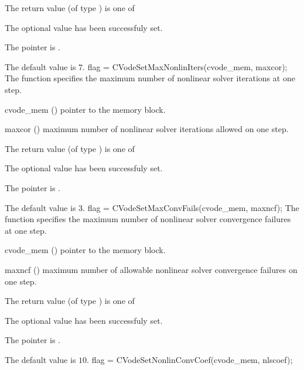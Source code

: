 {
  The return value  (of type ) is one of
  \begin{args}
  \item[\Id{SUCCESS}] 
    The optional value has been successfuly set.
  \item[\Id{CVS\_NO\_MEM}]
    The  pointer is .
  \end{args}
}
{
  The default value is $7$.
}
{
flag = CVodeSetMaxNonlinIters(cvode\_mem, maxcor);
}
{
  The function  specifies the maximum
  number of nonlinear solver iterations at one step.
}
{
  \begin{args}
  \item[cvode\_mem] ()
    pointer to the {\cvode} memory block.
  \item[maxcor] ()
    maximum number of nonlinear solver iterations allowed on one step.
  \end{args}
}
{
  The return value  (of type ) is one of
  \begin{args}
  \item[\Id{SUCCESS}] 
    The optional value has been successfuly set.
  \item[\Id{CVS\_NO\_MEM}]
    The  pointer is .
  \end{args}
}
{
  The default value is $3$.
}
{
flag = CVodeSetMaxConvFails(cvode\_mem, maxncf);
}
{
  The function  specifies the
  maximum number of nonlinear solver convergence failures at one step.
}
{
  \begin{args}
  \item[cvode\_mem] ()
    pointer to the {\cvode} memory block.
  \item[maxncf] ()
    maximum number of allowable nonlinear solver convergence failures
    on one step.
  \end{args}
}
{
  The return value  (of type ) is one of
  \begin{args}
  \item[\Id{SUCCESS}] 
    The optional value has been successfuly set.
  \item[\Id{CVS\_NO\_MEM}]
    The  pointer is .
  \end{args}
}
{
  The default value is $10$.
}
{
flag = CVodeSetNonlinConvCoef(cvode\_mem, nlscoef);
}
